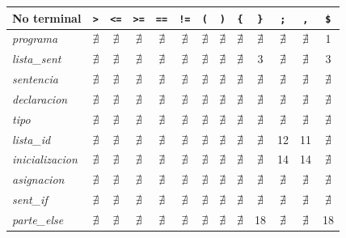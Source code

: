 \documentclass[12pt]{article}
\newcommand{\nt}[1]{\textit{#1}}
\begin{document}
\begin{table}[p]
\vspace{1.2em}
\footnotesize
\setlength{\tabcolsep}{5pt}
\renewcommand{\arraystretch}{1.08}
\begin{tabular}{@{}l*{12}{c}@{}}
\toprule
\textbf{No terminal} & \textbf{\texttt{>}} & \textbf{\texttt{<=}} & \textbf{\texttt{>=}} & \textbf{\texttt{==}} & \textbf{\texttt{!=}} & \textbf{\texttt{(}} & \textbf{\texttt{)}} & \textbf{\texttt{\{}} & \textbf{\texttt{\}}} & \textbf{\texttt{;}} & \textbf{\texttt{,}} & \textbf{\texttt{\$}} \\
\midrule
\nt{programa} & $\nexists$ & $\nexists$ & $\nexists$ & $\nexists$ & $\nexists$ & $\nexists$ & $\nexists$ & $\nexists$ & $\nexists$ & $\nexists$ & $\nexists$ & 1 \\
\nt{lista\_sent} & $\nexists$ & $\nexists$ & $\nexists$ & $\nexists$ & $\nexists$ & $\nexists$ & $\nexists$ & $\nexists$ & 3 & $\nexists$ & $\nexists$ & 3 \\
\nt{sentencia} & $\nexists$ & $\nexists$ & $\nexists$ & $\nexists$ & $\nexists$ & $\nexists$ & $\nexists$ & $\nexists$ & $\nexists$ & $\nexists$ & $\nexists$ & $\nexists$ \\
\nt{declaracion} & $\nexists$ & $\nexists$ & $\nexists$ & $\nexists$ & $\nexists$ & $\nexists$ & $\nexists$ & $\nexists$ & $\nexists$ & $\nexists$ & $\nexists$ & $\nexists$ \\
\nt{tipo} & $\nexists$ & $\nexists$ & $\nexists$ & $\nexists$ & $\nexists$ & $\nexists$ & $\nexists$ & $\nexists$ & $\nexists$ & $\nexists$ & $\nexists$ & $\nexists$ \\
\nt{lista\_id} & $\nexists$ & $\nexists$ & $\nexists$ & $\nexists$ & $\nexists$ & $\nexists$ & $\nexists$ & $\nexists$ & $\nexists$ & 12 & 11 & $\nexists$ \\
\nt{inicializacion} & $\nexists$ & $\nexists$ & $\nexists$ & $\nexists$ & $\nexists$ & $\nexists$ & $\nexists$ & $\nexists$ & $\nexists$ & 14 & 14 & $\nexists$ \\
\nt{asignacion} & $\nexists$ & $\nexists$ & $\nexists$ & $\nexists$ & $\nexists$ & $\nexists$ & $\nexists$ & $\nexists$ & $\nexists$ & $\nexists$ & $\nexists$ & $\nexists$ \\
\nt{sent\_if} & $\nexists$ & $\nexists$ & $\nexists$ & $\nexists$ & $\nexists$ & $\nexists$ & $\nexists$ & $\nexists$ & $\nexists$ & $\nexists$ & $\nexists$ & $\nexists$ \\
\nt{parte\_else} & $\nexists$ & $\nexists$ & $\nexists$ & $\nexists$ & $\nexists$ & $\nexists$ & $\nexists$ & $\nexists$ & 18 & $\nexists$ & $\nexists$ & 18 \\

\end{tabular}
\end{table}
\end{document}
